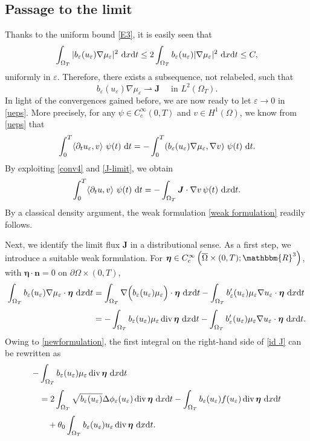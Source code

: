 \documentclass[11pt,  reqno]{amsart}%
\theoremstyle{plain}
\theoremstyle{definition}
\theoremstyle{remark}
\numberwithin{equation}{section}
\newcommand{\ve}{\varepsilon}
\def\div{\,\mathrm{div}}
\newcommand{\dx}{\textup{d}x}
\newcommand{\dt}{\textup{d}t}
\begin{document}
   \subsection{Passage to the limit}
Thanks to the uniform bound \eqref{E3}, it is easily seen that
    $$\int_{\Omega_T} |b_\ve(u_\ve)\nabla \mu_\ve|^2\ \dx \dt \le 2 \int_{\Omega_T} b_\ve(u_\ve)|\nabla \mu_\ve|^2\  \dx \dt \le C, $$
    uniformly in $\ve$. 
    Therefore, there exists a subsequence, not relabeled, such that
 \begin{equation}
 \label{J-limit}
    b_\ve(u_\ve) \nabla \mu_\ve \rightharpoonup \boldsymbol{J} \quad \textrm{ in }L^2(\Omega_T).
    \end{equation}
 In light of the convergences gained before, we are now ready to let $\ve \to 0$ in \eqref{ueps}. More precisely, for any $\psi \in C_c^\infty(0,T)$ and $v \in H^1(\Omega)$, we know from \eqref{ueps} that
$$
\int_0^T \langle \partial_t u_{\ve},v \rangle \ \psi(t) \ \dt = - \int_0^T 
(b_{\ve}(u_{\ve})\nabla \mu_{\ve}, \nabla v) \ \psi(t) \ \dt.
 $$
 By exploiting \eqref{conv4} and \eqref{J-limit},
 we obtain
 $$
\int_0^T \langle \partial_t u ,v \rangle \ \psi(t) \ \dt = - \int_{\Omega_T}
 \boldsymbol{J} \cdot \nabla v \, \psi(t) \ \dx \dt.
 $$
 By a classical density argument, the weak formulation \eqref{weak formulation} readily follows.
 
Next, we identify the limit flux $\boldsymbol{J}$ in a distributional sense. As a first step, we introduce a suitable weak formulation. 
For $\boldsymbol{\eta} \in C_c^\infty\left( \overline{\Omega}\times (0,T); \mathbbm{R}^3\right)$,
with $\boldsymbol{\eta}\cdot \mathbf{n}=0$ on $\partial \Omega\times (0,T)$,
 \begin{align}
    \int_{\Omega_T} b_{\ve}(u_{\ve})\nabla \mu_{\ve} \cdot \boldsymbol{\eta} \  \dx \dt 
    &= \int_{\Omega_T} \nabla \Big( b_{\ve}(u_{\ve})\mu_\ve\Big)\cdot \boldsymbol{\eta} \ \dx \dt 
    - \int_{\Omega_T} b'_\ve (u_\ve)\mu_\ve\nabla u_\ve \cdot \boldsymbol{\eta}\ \dx \dt \notag 
    \\[3pt]
        &= - \int_{\Omega_T}  b_{\ve}(u_{\ve})\mu_\ve \div \,  \boldsymbol{\eta}\ \dx \dt
        - \int_{\Omega_T} b'_\ve (u_\ve)\mu_\ve\nabla u_\ve \cdot \boldsymbol{\eta}\ \dx \dt. \label{id J}
    \end{align}
Owing to \eqref{newformulation}, the first integral on the right-hand side of \eqref{id J} can be rewritten as
  \begin{align}
        -&\int_{\Omega_T} b_{\ve}(u_{\ve})\mu _\ve  \div \,  \boldsymbol{\eta}\ \dx \dt  \notag
        \\[3pt]
    &= 2\int_{\Omega_T} \sqrt{b_\ve(u_\ve)}\Delta \phi_\ve(u_\ve)\div \,   \boldsymbol{\eta} \ \dx \dt  - \int_{\Omega_T} b_\ve(u_\ve) f(u_\ve)\div \,   \boldsymbol{\eta}  \ \dx \dt   \notag  \\[3pt]
    &\quad  + \theta_0 \int_{\Omega_T} b_\ve(u_\ve) u_\ve \div \,  \boldsymbol{\eta} \ \dx \dt .
    \label{primo}
    \end{align}
 
\end{document}
